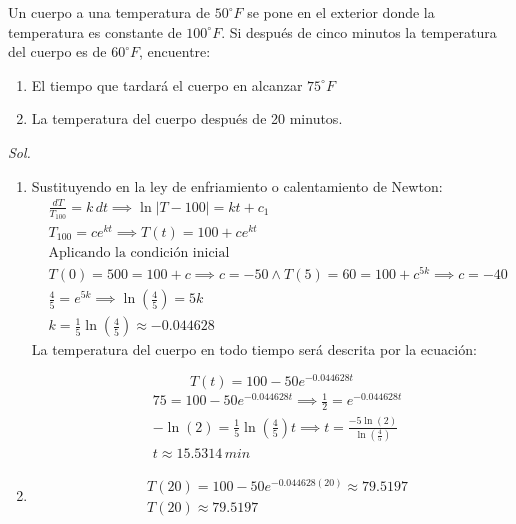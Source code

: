 \begin{problem}
    Un cuerpo a una temperatura de $50^{\circ}F$ se pone en el exterior donde la temperatura es constante de $100^{\circ}F$. Si después de cinco minutos la temperatura del cuerpo es de $60^{\circ}F$, encuentre:
\begin{enumerate}
    \item El tiempo que tardará el cuerpo en alcanzar $75^{\circ}F$
    \item La temperatura del cuerpo después de 20 minutos.
\end{enumerate}
\end{problem}
\textit{ Sol. }

\begin{enumerate}
    \item Sustituyendo en la ley de enfriamiento o calentamiento de Newton:
    \begin{align*}
        &\frac{dT}{T_100}=k\,dt\implies \ln{\left\lvert T-100\right\rvert}=kt+c_1\\
        &T_100=ce^{kt}\implies T(t)=100+ce^{kt}\\
        &\text{Aplicando la condición inicial}\\
        &T(0)=500=100+c\implies c=-50\land T(5)=60=100+c^{5k}\implies c=-40\\
        &\frac{4}{5}=e^{5k}\implies \ln{\left(\frac{4}{5}\right)}=5k\\
        &k=\frac{1}{5}\ln{\left(\frac{4}{5}\right)}\approx -0.044628
    \end{align*}
    La temperatura del cuerpo en todo tiempo será descrita por la ecuación:
    
    \begin{equation*}
        T(t)=100-50e^{-0.044628t}
    \end{equation*}
    \begin{align*}
        &75=100-50e^{-0.044628t}\implies \frac{1}{2}=e^{-0.044628t}\\
        &-\ln{(2)}=\frac{1}{5}\ln{\left(\frac{4}{5}\right)}t\implies t=\frac{-5\ln{(2)}}{\ln{\left( \frac{4}{5} \right)}}\\
        &t\approx 15.5314\, min
    \end{align*}
    \item \begin{align*}
        &T(20)=100-50e^{-0.044628(20)}\approx 79.5197\\
        &T(20)\approx 79.5197
    \end{align*}
\end{enumerate}

